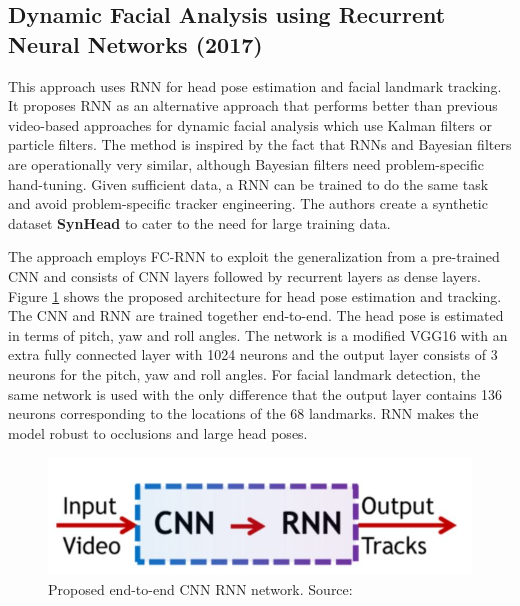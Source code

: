 \documentclass{llncs}
\begin{document}
\subsection{Dynamic Facial Analysis using Recurrent Neural Networks (2017) \cite{dynamic_facial_analysis}}
This approach uses RNN for head pose estimation and facial landmark tracking. 
It proposes RNN as an alternative approach that performs better than previous video-based approaches for dynamic facial analysis which use Kalman filters or particle filters. The method is inspired by the fact that RNNs and Bayesian filters are operationally very similar, although Bayesian filters need problem-specific hand-tuning. Given sufficient data, a RNN can be trained to do the same task and avoid problem-specific tracker engineering. 
The authors create a synthetic dataset \textbf{SynHead} to cater to the need for large training data. 

The approach employs FC-RNN to exploit the generalization from a pre-trained CNN and consists of CNN layers followed by recurrent layers as dense layers. Figure \ref{cnn_rnn} shows the proposed architecture for head pose estimation and tracking. The CNN and RNN are trained together end-to-end. The head pose is estimated in terms of pitch, yaw and roll angles. The network is a modified VGG16 with an extra fully connected layer with 1024 neurons and the output layer consists of 3 neurons for the pitch, yaw and roll angles. For facial landmark detection, the same network is used with the only difference that the output layer contains 136 neurons corresponding to the locations of the 68 landmarks. RNN makes the model robust to occlusions and large head poses.\\

\begin{figure}
\centering
\includegraphics[scale=0.3]{Media/cnn_rnn}
\caption{Proposed end-to-end CNN RNN network. Source:\cite{dynamic_facial_analysis}}
\label{cnn_rnn}
\end{figure}
\end{document}
